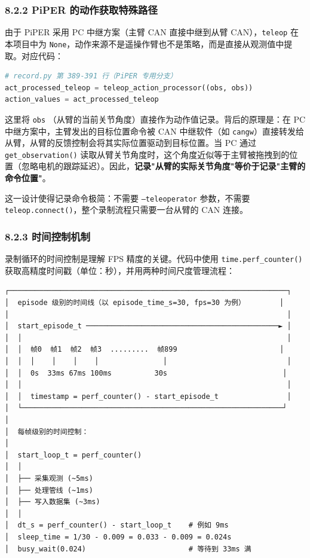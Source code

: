 \documentclass[UTF8,a4paper,11pt]{ctexart}
\begin{document}
{\subsubsection{8.2.2 PiPER 的动作获取特殊路径}

由于 PiPER 采用 PC 中继方案（主臂 CAN 直接中继到从臂 CAN），\texttt{teleop} 在本项目中为 \texttt{None}，动作来源不是遥操作臂也不是策略，而是直接从观测值中提取。对应代码：

\begin{lstlisting}[language=python]
# record.py 第 389-391 行（PiPER 专用分支）
act_processed_teleop = teleop_action_processor((obs, obs))
action_values = act_processed_teleop
\end{lstlisting}

这里将 \texttt{obs} （从臂的当前关节角度）直接作为动作值记录。背后的原理是：在 PC 中继方案中，主臂发出的目标位置命令被 CAN 中继软件（如 \texttt{cangw}）直接转发给从臂，从臂的反馈控制会将其实际位置驱动到目标位置。当 PC 通过 \texttt{get_observation()} 读取从臂关节角度时，这个角度近似等于主臂被拖拽到的位置（忽略电机的跟踪延迟）。因此，\textbf{记录"从臂的实际关节角度"等价于记录"主臂的命令位置"}。

这一设计使得记录命令极简：不需要 \texttt{--teleoperator} 参数，不需要 \texttt{teleop.connect()}，整个录制流程只需要一台从臂的 CAN 连接。

\subsubsection{8.2.3 时间控制机制}

录制循环的时间控制是理解 FPS 精度的关键。代码中使用 \texttt{time.perf_counter()} 获取高精度时间戳（单位：秒），并用两种时间尺度管理流程：

\begin{lstlisting}[language=text]
┌─────────────────────────────────────────────────────────────────┐
│  episode 级别的时间线（以 episode_time_s=30, fps=30 为例）        │
│                                                                 │
│  start_episode_t ─────────────────────────────────────────────► │
│  │                                                              │
│  │  帧0  帧1  帧2  帧3  .........  帧899                        │
│  │  │    │    │    │               │                            │
│  │  0s  33ms 67ms 100ms          30s                           │
│  │                                                              │
│  │  timestamp = perf_counter() - start_episode_t                │
│  └─────────────────────────────────────────────────────────────┘
│
│  每帧级别的时间控制：
│
│  start_loop_t = perf_counter()
│  │
│  ├── 采集观测 (~5ms)
│  ├── 处理管线 (~1ms)
│  ├── 写入数据集 (~3ms)
│  │
│  dt_s = perf_counter() - start_loop_t    # 例如 9ms
│  sleep_time = 1/30 - 0.009 = 0.033 - 0.009 = 0.024s
│  busy_wait(0.024)                        # 等待到 33ms 满
\end{lstlisting}

}
\end{document}
